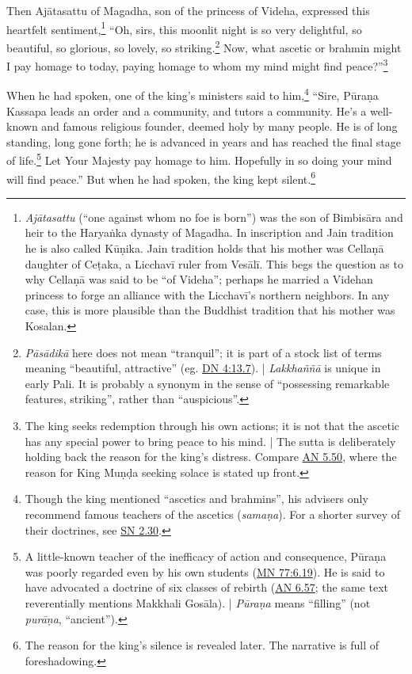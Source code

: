 \documentclass[12pt,openany]{book}%
\begin{document}
Then \textsanskrit{Ajātasattu} of Magadha, son of the princess of Videha, expressed this heartfelt sentiment,\footnote{\textit{\textsanskrit{Ajātasattu}} (“one against whom no foe is born”) was the son of \textsanskrit{Bimbisāra} and heir to the \textsanskrit{Haryaṅka} dynasty of Magadha. In inscription and Jain tradition he is also called \textsanskrit{Kūṇika}. Jain tradition holds that his mother was \textsanskrit{Cellaṇā} daughter of \textsanskrit{Ceṭaka}, a \textsanskrit{Licchavī} ruler from \textsanskrit{Vesālī}. This begs the question as to why \textsanskrit{Cellaṇā} was said to be “of Videha”; perhaps he married a Videhan princess to forge an alliance with the \textsanskrit{Licchavī}’s northern neighbors. In any case, this is more plausible than the Buddhist tradition that his mother was Kosalan. } “Oh, sirs, this moonlit night is so very delightful, so beautiful, so glorious, so lovely, so striking.\footnote{\textit{\textsanskrit{Pāsādikā}} here does not mean “tranquil”; it is part of a stock list of terms meaning “beautiful, attractive” (eg. \href{https://suttacentral.net/dn4/en/sujato\#13.7}{DN 4:13.7}). | \textit{\textsanskrit{Lakkhaññā}} is unique in early Pali. It is probably a synonym in the sense of “possessing remarkable features, striking”, rather than “auspicious”. } Now, what ascetic or brahmin might I pay homage to today, paying homage to whom my mind might find peace?”\footnote{The king seeks redemption through his own actions; it is not that the ascetic has any special power to bring peace to his mind. | The sutta is deliberately holding back the reason for the king’s distress. Compare \href{https://suttacentral.net/an5.50/en/sujato}{AN 5.50}, where the reason for King \textsanskrit{Muṇḍa} seeking solace is stated up front. } 

When he had spoken, one of the king’s ministers said to him,\footnote{Though the king mentioned “ascetics and brahmins”, his advisers only recommend famous teachers of the ascetics (\textit{\textsanskrit{samaṇa}}). For a shorter survey of their doctrines, see \href{https://suttacentral.net/sn2.30/en/sujato}{SN 2.30}. } “Sire, \textsanskrit{Pūraṇa} Kassapa leads an order and a community, and tutors a community. He’s a well-known and famous religious founder, deemed holy by many people. He is of long standing, long gone forth; he is advanced in years and has reached the final stage of life.\footnote{A little-known teacher of the inefficacy of action and consequence, \textsanskrit{Pūraṇa} was poorly regarded even by his own students (\href{https://suttacentral.net/mn77/en/sujato\#6.19}{MN 77:6.19}). He is said to have advocated a doctrine of six classes of rebirth (\href{https://suttacentral.net/an6.57/en/sujato}{AN 6.57}; the same text reverentially mentions Makkhali \textsanskrit{Gosāla}). | \textit{\textsanskrit{Pūraṇa}} means “filling” (not \textit{\textsanskrit{purāṇa}}, “ancient”). } Let Your Majesty pay homage to him. Hopefully in so doing your mind will find peace.” But when he had spoken, the king kept silent.\footnote{The reason for the king’s silence is revealed later. The narrative is full of foreshadowing. } 
\end{document}
